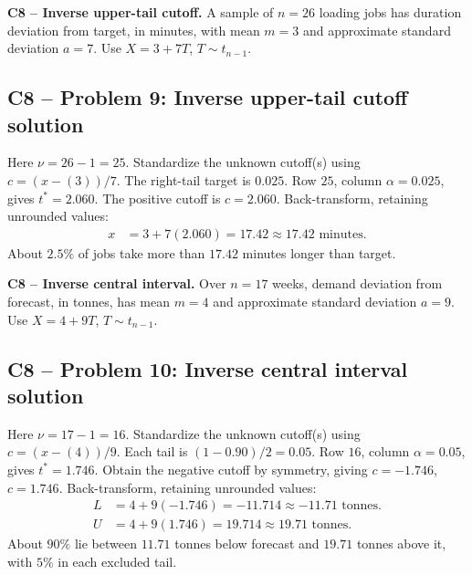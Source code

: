 {
\textbf{C8 -- Inverse upper-tail cutoff.} A sample of $n=26$ loading jobs has duration deviation from target, in minutes, with mean $m=3$ and approximate standard deviation $a=7$. Use $X=3+7T$, $T\sim t_{n-1}$.
\label{sol:q9}
\subsection*{C8 -- Problem 9: Inverse upper-tail cutoff solution }
Here $\nu=26-1=25$. Standardize the unknown cutoff(s) using $c=(x-(3))/7$. The right-tail target is $0.025$.
Row $25$, column $\alpha=0.025$, gives $t^*=2.060$. 
The positive cutoff is $c=2.060$.
Back-transform, retaining unrounded values:
\[
\begin{aligned}
x&=3+7(2.060)=17.42\approx\boxed{17.42\text{ minutes}}.
\end{aligned}
\]
About $2.5\%$ of jobs take more than $17.42$ minutes longer than target.
\secInicio[][sec:q9]
}

{
\textbf{C8 -- Inverse central interval.} Over $n=17$ weeks, demand deviation from forecast, in tonnes, has mean $m=4$ and approximate standard deviation $a=9$. Use $X=4+9T$, $T\sim t_{n-1}$.
\label{sol:q10}
\subsection*{C8 -- Problem 10: Inverse central interval solution }
Here $\nu=17-1=16$. Standardize the unknown cutoff(s) using $c=(x-(4))/9$. Each tail is $(1-0.90)/2=0.05$.
Row $16$, column $\alpha=0.05$, gives $t^*=1.746$. 
Obtain the negative cutoff by symmetry, giving $c=-1.746$, $c=1.746$.
Back-transform, retaining unrounded values:
\[
\begin{aligned}
L&=4+9(-1.746)=-11.714\approx\boxed{-11.71\text{ tonnes}}.\\
U&=4+9(1.746)=19.714\approx\boxed{19.71\text{ tonnes}}.
\end{aligned}
\]
About $90\%$ lie between $11.71$ tonnes below forecast and $19.71$ tonnes above it, with $5\%$ in each excluded tail.
\secInicio[][sec:q10]
}


